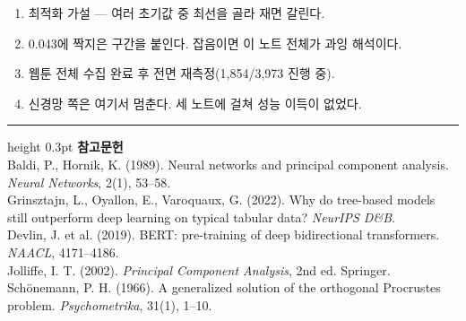 \documentclass[10pt]{article}
\begin{document}
\begin{enumerate}[leftmargin=1.3em,itemsep=0.15em]
\item 최적화 가설 --- 여러 초기값 중 최선을 골라 재면 갈린다.
\item 0.043에 짝지은 구간을 붙인다. 잡음이면 이 노트 전체가 과잉 해석이다.
\item 웹툰 전체 수집 완료 후 전면 재측정(1,854/3,973 진행 중).
\item 신경망 쪽은 여기서 멈춘다. 세 노트에 걸쳐 성능 이득이 없었다.
\end{enumerate}

\vspace{0.6em}
\hrule height 0.3pt
\vspace{0.5em}
{\footnotesize
\textbf{참고문헌}\\[0.3em]
Baldi, P., Hornik, K. (1989). Neural networks and principal component analysis.
\emph{Neural Networks}, 2(1), 53--58.\\[0.15em]
Grinsztajn, L., Oyallon, E., Varoquaux, G. (2022). Why do tree-based models still
outperform deep learning on typical tabular data? \emph{NeurIPS D\&B}.\\[0.15em]
Devlin, J. et al. (2019). BERT: pre-training of deep bidirectional transformers.
\emph{NAACL}, 4171--4186.\\[0.15em]
Jolliffe, I. T. (2002). \emph{Principal Component Analysis}, 2nd ed. Springer.\\[0.15em]
Schönemann, P. H. (1966). A generalized solution of the orthogonal Procrustes
problem. \emph{Psychometrika}, 31(1), 1--10.
}
\end{document}
